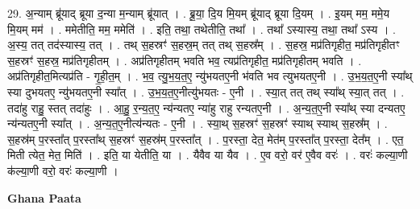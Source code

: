\documentclass[17pt]{extarticle}
\begin{document}
29. अ॒न्याम् ब्रू॑याद् ब्रूया द॒न्या म॒न्याम् ब्रू॑यात् । . ब्रू॒या॒ दि॒य मि॒यम् ब्रू॑याद् ब्रूया दि॒यम् । . इ॒यम् मम॒ ममे॒य मि॒यम् मम॑ । . ममेतीति॒ मम॒ ममेति॑ । . इति॒ तथा॒ तथेतीति॒ तथा᳚ । . तथा᳚ ऽस्यास्य॒ तथा॒ तथा᳚ ऽस्य । . अ॒स्य॒ तत् तद॑स्यास्य॒ तत् । . तथ् स॒हस्रꣳ॑ स॒हस्र॒म् तत् तथ् स॒हस्र᳚म् । . स॒हस्र॒ मप्र॑तिगृहीत॒ मप्र॑तिगृहीतꣳ स॒हस्रꣳ॑ स॒हस्र॒ मप्र॑तिगृहीतम् । . अप्र॑तिगृहीतम् भवति भव॒ त्यप्र॑तिगृहीत॒ मप्र॑तिगृहीतम् भवति । . अप्र॑तिगृहीत॒मित्यप्र॑ति - गृ॒ही॒त॒म् । . भ॒व॒ त्यु॒भ॒य॒त॒ए॒ न्यु॑भयतए॒नी भ॑वति भव त्युभयतए॒नी । . उ॒भ॒य॒त॒ए॒नी स्या᳚थ् स्या दुभयतए॒ न्यु॑भयतए॒नी स्या᳚त् । . उ॒भ॒य॒त॒ए॒नीत्यु॑भयतः - ए॒नी । . स्या॒त् तत् तथ् स्या᳚थ् स्या॒त् तत् । . तदा॑हु राहु॒ स्तत् तदा॑हुः । . आ॒हु॒ र॒न्य॒त॒ए॒ न्य॑न्यतए॒ न्या॑हु राहु रन्यतए॒नी । . अ॒न्य॒त॒ए॒नी स्या᳚थ् स्या दन्यतए॒ न्य॑न्यतए॒नी स्या᳚त् । . अ॒न्य॒त॒ए॒नीत्य॑न्यतः - ए॒नी । . स्या॒थ् स॒हस्रꣳ॑ स॒हस्रꣳ॑ स्याथ् स्याथ् स॒हस्र᳚म् । . स॒हस्र॑म् प॒रस्ता᳚त् प॒रस्ता᳚थ् स॒हस्रꣳ॑ स॒हस्र॑म् प॒रस्ता᳚त् । . प॒रस्ता॒ देत॒ मेत॑म् प॒रस्ता᳚त् प॒रस्ता॒ देत᳚म् । . एत॒ मिती त्येत॒ मेत॒ मिति॑ । . इति॒ या येतीति॒ या । . यैवैव या यैव । . ए॒व वरो॒ वर॑ ए॒वैव वरः॑ । . वरः॑ कल्या॒णी क॑ल्या॒णी वरो॒ वरः॑ कल्या॒णी । \newline

\textbf{Ghana Paata } \newline
\end{document}
